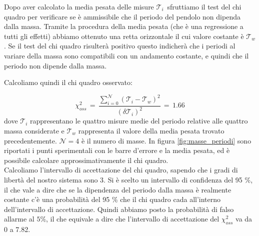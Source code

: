 \label{m_chi_pesata}

Dopo aver calcolato la media pesata delle misure $\mathcal{T}_i\,$ sfruttiamo il test del chi quadro per verificare se
è ammissibile che il periodo del pendolo non dipenda dalla massa. Tramite la procedura della media pesata (che è una regressione
a tutti gli effetti) abbiamo ottenuto
una retta orizzontale il cui valore costante è $\mathcal{T}_w$. Se il test del chi quadro risulterà positivo questo indicherà
che i periodi al variare della massa sono compatibili con un andamento costante, e quindi che il periodo non dipende dalla massa.


%
Calcoliamo quindi il chi quadro osservato:

\begin{equation*}
	\chi_{oss}^2 \,=\, \frac{\sum_{i=0}^{\mathcal{N}} (\mathcal{T}_i - \mathcal{T}_w)^2}{(\delta \mathcal{T}_i)^2} \,=\, 1.66
\end{equation*}
%
dove $\mathcal{T}_i$ rappresentano le quattro misure medie del periodo relative alle quattro massa considerate e $\mathcal{T}_w$ rappresenta il valore della media pesata trovato precedentemente. $\mathcal{N} = 4$ è il numero di masse. In figura \ref{fig:masse_periodi} sono
riportati i punti sperimentali con le barre d'errore e la media pesata, ed è possibile calcolare approssimativamente il chi quadro. \\

Calcoliamo l'intervallo di accettazione del chi quadro, sapendo che i gradi di libertà del nostro sistema sono 3.
Si è scelto un intervallo di confidenza del 95 \%, il che vale a dire che se la dipendenza del periodo dalla massa è realmente costante
c'è una probabilità del 95 \% che il chi quadro cada all'interno dell'intervallo di accettazione.
Quindi abbiamo posto la probabilità di falso allarme al $5\%$, il che equivale a dire che l'intervallo di accettazione del $\chi_{oss}^2$ va da 0 a 7.82.

